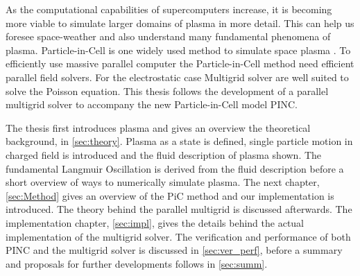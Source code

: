 
	As the computational capabilities of supercomputers increase, it is becoming more
	viable to simulate larger domains of plasma in more detail. This can help us foresee space-weather
	and also understand many fundamental phenomena of plasma. Particle-in-Cell is one widely used
	method to simulate space plasma \citep{lapenta_particle_2012}.	To efficiently use
	massive parallel computer the Particle-in-Cell method need efficient parallel
	field solvers. For the electrostatic case Multigrid solver are well suited to
	solve the Poisson equation. This thesis follows the development of a parallel
	multigrid solver to accompany the new Particle-in-Cell model PINC.

 	The thesis first introduces plasma and gives an overview the theoretical background, in \cref{sec:theory}.
	Plasma as a state is defined, single particle motion in charged field is introduced and the fluid
	description of plasma shown. The fundamental Langmuir Oscillation is derived from the fluid
	description before a short overview of ways to numerically simulate plasma.
	The next chapter, \cref{sec:Method} gives an overview of the PiC method and our implementation
	is introduced. The theory behind the parallel multigrid is discussed afterwards.
	The implementation chapter, \cref{sec:impl}, gives the details behind the actual implementation
	of the multigrid solver.
	The verification and performance of both PINC and the multigrid solver is discussed in \cref{sec:ver_perf},
	before a summary and proposals for further developments follows in \cref{sec:summ}.
